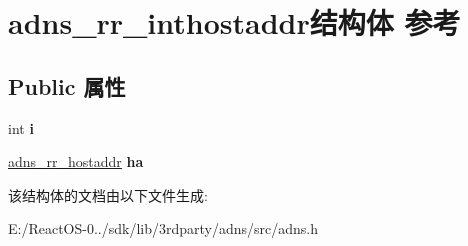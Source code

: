 \hypertarget{structadns__rr__inthostaddr}{}\section{adns\+\_\+rr\+\_\+inthostaddr结构体 参考}
\label{structadns__rr__inthostaddr}
\subsection*{Public 属性}
\begin{DoxyCompactItemize}
\item 
\mbox{\label{structadns__rr__inthostaddr_ae698130b27c5528831c5ebd14dc5cabe}} 
int {\bfseries i}
\item 
\mbox{\label{structadns__rr__inthostaddr_aa655215c3d9557832d3ff6bb452d6af7}} 
\hyperlink{structadns__rr__hostaddr}{adns\+\_\+rr\+\_\+hostaddr} {\bfseries ha}
\end{DoxyCompactItemize}


该结构体的文档由以下文件生成\+:\begin{DoxyCompactItemize}
\item 
E\+:/\+React\+O\+S-\/0../sdk/lib/3rdparty/adns/src/adns.\+h\end{DoxyCompactItemize}
